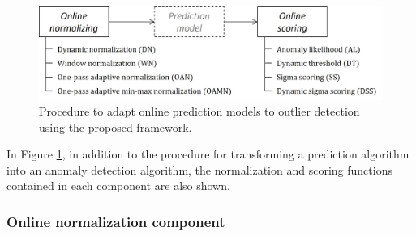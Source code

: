 \documentclass[a4paper]{article}\usepackage[]{graphicx}\usepackage[]{color}
\begin{document}
\begin{figure}[htbp]
\centering
\includegraphics[width=0.5\linewidth]{AD-FRAMEWORK.jpg}
\caption{Procedure to adapt online prediction models to outlier detection using the proposed framework.}
\label{fig:ad-framework}
\end{figure}

In Figure \ref{fig:ad-framework}, in addition to the procedure for transforming a prediction algorithm into an anomaly detection algorithm, the normalization and scoring functions contained in each component are also shown.

\subsubsection{Online normalization component}
\end{document}
